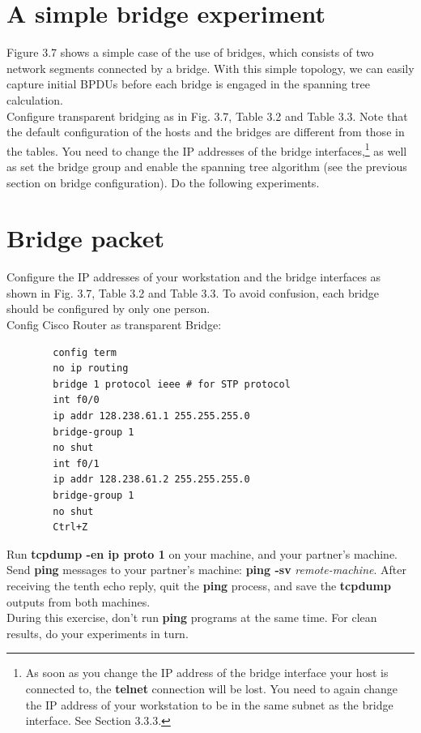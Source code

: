 \documentclass{../UTNetLab}
\begin{document}
\section*{A simple bridge experiment}
    Figure 3.7 shows a simple case of the use of bridges, which consists of two network segments connected by a bridge.
    With this simple topology, we can easily capture initial BPDUs before each bridge is engaged in the spanning tree calculation. \\
    Configure transparent bridging as in Fig.
    3.7, Table 3.2 and Table 3.3.
    Note that the default configuration of the hosts and the bridges are different from those in the tables.
    You need to change the IP addresses of the bridge interfaces,\footnote{As soon as you change the IP address of the bridge interface your host is connected to, the \textbf{telnet} connection will be lost.
    You need to again change the IP address of your workstation to be in the same subnet as the bridge interface. See Section 3.3.3.} as well as set the bridge group and enable the spanning tree algorithm (see the previous section on bridge configuration).
    Do the following experiments.

\section{Bridge packet}
    Configure the IP addresses of your workstation and the bridge interfaces as shown in Fig. 3.7, Table 3.2 and Table 3.3.
    To avoid confusion, each bridge should be configured by only one person. \\
    Config Cisco Router as transparent Bridge:
    \begin{verbatim}
        config term
        no ip routing
        bridge 1 protocol ieee # for STP protocol
        int f0/0
        ip addr 128.238.61.1 255.255.255.0
        bridge-group 1
        no shut
        int f0/1
        ip addr 128.238.61.2 255.255.255.0
        bridge-group 1
        no shut
        Ctrl+Z
    \end{verbatim}
    Run \textbf{tcpdump -en ip proto 1} on your machine, and your partner’s machine. Send \textbf{ping} messages to your partner’s machine: \textbf{ping -sv} \textit{remote-machine}.
    After receiving the tenth echo reply, quit the \textbf{ping} process, and save the \textbf{tcpdump} outputs from both machines. \\
    During this exercise, don’t run \textbf{ping} programs at the same time. For clean results, do your experiments in turn.
\end{document}
